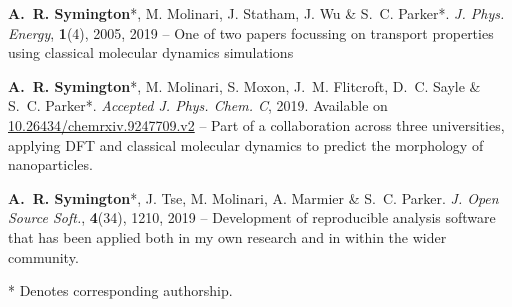 \begin{cventriesy}
  \cventryy
    {
      \begin{cvitemsy}
        \item {\textbf{A.~R. Symington}*, M. Molinari, J. Statham, J. Wu \& S.~C. Parker*. \emph{J. Phys. Energy}, \textbf{1}(4), 2005, 2019 -- One of two papers focussing on transport properties using classical molecular dynamics simulations}
      \vspace{1mm}
        \item {\textbf{A.~R. Symington}*, M. Molinari, S. Moxon, J.~M. Flitcroft, D.~C. Sayle \& S.~C. Parker*. \emph{Accepted J. Phys. Chem. C}, 2019. Available on \href{https://doi.org/10.26434/chemrxiv.9247709.v2}{10.26434/chemrxiv.9247709.v2} --  Part of a collaboration across three universities, applying DFT and classical molecular dynamics to predict the morphology of nanoparticles.}
    \vspace{1mm}
        \item {\textbf{A.~R. Symington}*, J. Tse, M. Molinari, A. Marmier \& S.~C. Parker. \emph{J. Open Source Soft.}, \textbf{4}(34), 1210, 2019 -- Development of reproducible analysis software that has been applied both in my own research and in within the wider community.}
      \end{cvitemsy}
    \vspace{1mm}
        \item{* Denotes corresponding authorship.}
    }
\end{cventriesy}